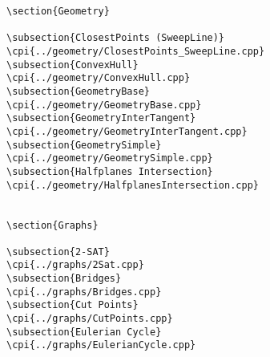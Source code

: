 {\begin{verbatim}
\section{Geometry}

\subsection{ClosestPoints (SweepLine)}
\cpi{../geometry/ClosestPoints_SweepLine.cpp}
\subsection{ConvexHull}
\cpi{../geometry/ConvexHull.cpp}
\subsection{GeometryBase}
\cpi{../geometry/GeometryBase.cpp}
\subsection{GeometryInterTangent}
\cpi{../geometry/GeometryInterTangent.cpp}
\subsection{GeometrySimple}
\cpi{../geometry/GeometrySimple.cpp}
\subsection{Halfplanes Intersection}
\cpi{../geometry/HalfplanesIntersection.cpp}


\section{Graphs}

\subsection{2-SAT}
\cpi{../graphs/2Sat.cpp}
\subsection{Bridges}
\cpi{../graphs/Bridges.cpp}
\subsection{Cut Points}
\cpi{../graphs/CutPoints.cpp}
\subsection{Eulerian Cycle}
\cpi{../graphs/EulerianCycle.cpp}

\end{verbatim}}
